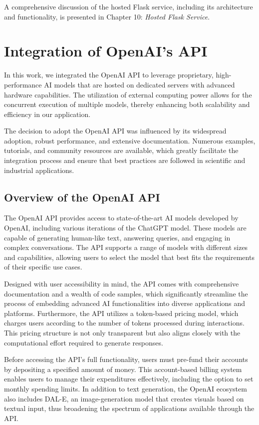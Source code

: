 A comprehensive discussion of the hosted Flask service, including its architecture and functionality, is presented in Chapter 10: \textit{Hosted Flask Service}.



\section{Integration of OpenAI's API}

In this work, we integrated the OpenAI API to leverage proprietary, 
high-performance AI models that are hosted on dedicated servers with advanced hardware capabilities. 
The utilization of external computing power allows for the concurrent execution of multiple models, 
thereby enhancing both scalability and efficiency in our application.

The decision to adopt the OpenAI API was influenced by its widespread adoption, 
robust performance, and extensive documentation. Numerous examples, tutorials, and community resources are available, 
which greatly facilitate the integration process and ensure that best practices are followed in scientific and industrial applications.

\subsection{Overview of the OpenAI API}

The OpenAI API provides access to state-of-the-art AI models developed by OpenAI, including various iterations of the ChatGPT model. 
These models are capable of generating human-like text, answering queries, and engaging in complex conversations. 
The API supports a range of models with different sizes and capabilities, allowing users to select the model that best fits 
the requirements of their specific use cases.

Designed with user accessibility in mind, the API comes with comprehensive documentation and a wealth of code samples, 
which significantly streamline the process of embedding advanced AI functionalities into diverse applications and platforms. 
Furthermore, the API utilizes a token-based pricing model, which charges users according to the number of tokens processed during interactions. 
This pricing structure is not only transparent but also aligns closely with the computational effort required to generate responses.

Before accessing the API's full functionality, users must pre-fund their accounts by depositing a specified amount of money. 
This account-based billing system enables users to manage their expenditures effectively, including the option to set monthly spending limits. 
In addition to text generation, the OpenAI ecosystem also includes DAL-E, an image-generation model that creates visuals based on textual input, 
thus broadening the spectrum of applications available through the API.

